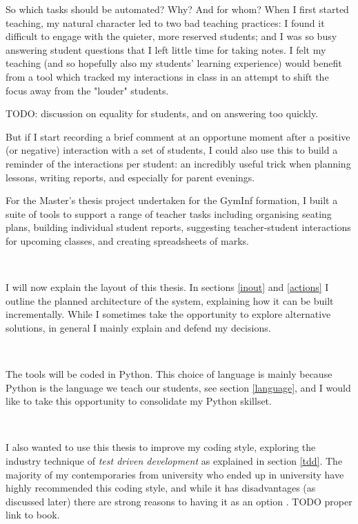 \documentclass[10pt]{article}
\begin{document}
So which tasks should be automated? Why? And for whom? When I first started teaching, my natural character led to two bad teaching practices: I found it difficult to engage with the quieter, more reserved students; and I was so busy answering student questions that I left little time for taking notes. I felt my teaching (and so hopefully also my students' learning experience) would benefit from a tool which tracked my interactions in class in an attempt to shift the focus away from the "louder" students. 

TODO: discussion on equality for students, and \cite{Hat12} on answering too quickly.

But if I start recording a brief comment at an opportune moment after a positive (or negative) interaction with a set of students, I could also use this to build a reminder of the interactions per student: an incredibly useful trick when planning lessons, writing reports, and especially for parent evenings.

For the Master's thesis project undertaken for the GymInf formation, I built a suite of tools to support a range of teacher tasks including organising seating plans, building individual student reports, suggesting teacher-student interactions for upcoming classes, and creating spreadsheets of marks. 

\

I will now explain the layout of this thesis. In sections \ref{inout} and \ref{actions} I outline the planned architecture of the system, explaining how it can be built incrementally. While I sometimes take the opportunity to explore alternative solutions, in general I mainly explain and defend my decisions.

\

The tools will be coded in Python. This choice of language is mainly because Python is the language we teach our students, see section \ref{language}, and I would like to take this opportunity to consolidate my Python skillset.

\

I also wanted to use this thesis to improve my coding style, exploring the industry technique of \emph{test driven development} as explained in section \ref{tdd}. The majority of my contemporaries from university who ended up in university have highly recommended this coding style, and while it has disadvantages (as discussed later) there are strong reasons to having it as an option \cite{Amman16}. TODO proper link to book.

\
\end{document}
